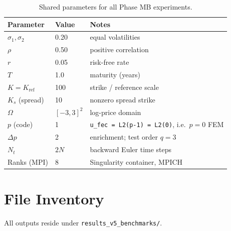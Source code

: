 \documentclass[11pt,a4paper]{article}
\newcommand{\Kref}{K_{\mathrm{ref}}}
\newcommand{\Ks}{K_s}
\begin{document}
\begin{table}[htbp]
\centering
\caption{Shared parameters for all Phase MB experiments.}
\label{tab:params}
\begin{tabular}{@{}lll@{}}
\toprule
Parameter & Value & Notes \\
\midrule
$\sigma_1, \sigma_2$ & 0.20 & equal volatilities \\
$\rho$               & 0.50 & positive correlation \\
$r$                  & 0.05 & risk-free rate \\
$T$                  & 1.0  & maturity (years) \\
$K = \Kref$          & 100  & strike / reference scale \\
$\Ks$ (spread)       & 10   & nonzero spread strike \\
$\Omega$             & $[-3,3]^2$ & log-price domain \\
$p$ (code)           & 1    & \texttt{u\_fec = L2(p-1) = L2(0)}, i.e.\ $p=0$ FEM \\
$\Delta p$           & 2    & enrichment; test order $q=3$ \\
$N_t$                & $2N$ & backward Euler time steps \\
Ranks (MPI)          & 8    & Singularity container, MPICH \\
\bottomrule
\end{tabular}
\end{table}

\section{File Inventory}
\label{app:files}

All outputs reside under \texttt{results\_v5\_benchmarks/}.
\end{document}
